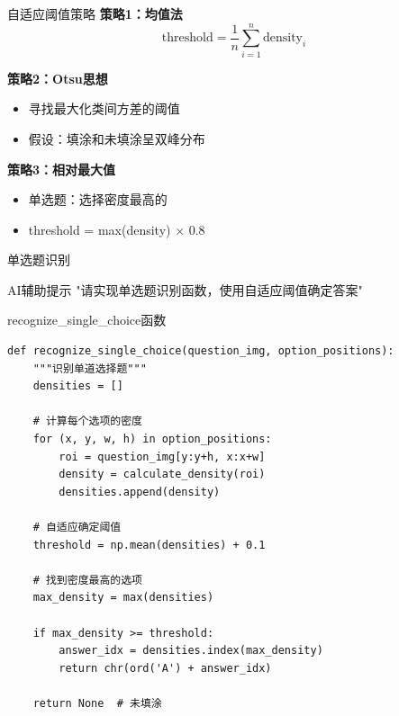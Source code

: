 \begin{frame}{自适应阈值策略}
    \textbf{策略1：均值法}
    \[ \text{threshold} = \frac{1}{n}\sum_{i=1}^{n}\text{density}_i \]

    \textbf{策略2：Otsu思想}
    \begin{itemize}
        \item 寻找最大化类间方差的阈值
        \item 假设：填涂和未填涂呈双峰分布
    \end{itemize}

    \textbf{策略3：相对最大值}
    \begin{itemize}
        \item 单选题：选择密度最高的
        \item threshold = max(density) × 0.8
    \end{itemize}
\end{frame}

\begin{frame}[fragile]{单选题识别}
    \begin{block}{AI辅助提示}
        \aihint{} "请实现单选题识别函数，使用自适应阈值确定答案"
    \end{block}

    \begin{block}{recognize\_single\_choice函数}
    \begin{lstlisting}[basicstyle=\ttfamily\scriptsize]
def recognize_single_choice(question_img, option_positions):
    """识别单道选择题"""
    densities = []

    # 计算每个选项的密度
    for (x, y, w, h) in option_positions:
        roi = question_img[y:y+h, x:x+w]
        density = calculate_density(roi)
        densities.append(density)

    # 自适应确定阈值
    threshold = np.mean(densities) + 0.1

    # 找到密度最高的选项
    max_density = max(densities)

    if max_density >= threshold:
        answer_idx = densities.index(max_density)
        return chr(ord('A') + answer_idx)

    return None  # 未填涂
    \end{lstlisting}
    \end{block}
\end{frame}

